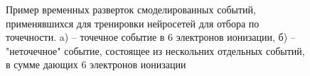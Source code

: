 \begin{figure}[ht]
  \begin{minipage}[ht]{0.49\linewidth}    
  \end{minipage}
  \hfill
  \begin{minipage}[ht]{0.49\linewidth}  
  \end{minipage}
  \caption[Пример временных разверток смоделированных событий, применявшихся для тренировки нейросетей для отбора по точечности.]{Пример временных разверток смоделированных событий, применявшихся для тренировки нейросетей для отбора по точечности. a) -- точечное событие в 6 электронов ионизации, б) -- "неточечное" событие, состоящее из нескольних отдельных событий, в сумме дающих 6 электронов ионизации}
  \label{img:cevnsbckgevents}  
\end{figure}

